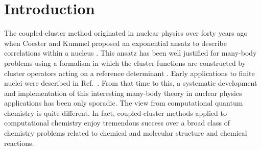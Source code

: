 
%


\section{Introduction}
\label{sec:introduction}

The coupled-cluster method originated in nuclear physics over
forty years ago when Coester and Kummel proposed an exponential ansatz 
to describe correlations within a nucleus 
\cite{coester58,coester60}. This ansatz has been well justified
for many-body problems using a formalism in which the
cluster functions are constructed by cluster operators acting on 
a reference determinant \cite{harris92}. Early applications 
to finite nuclei were described in Ref.~\cite{kum78}. 
From that
time to this, a systematic development and implementation 
of this interesting many-body theory in nuclear 
physics applications has been only sporadic. The view from 
computational quantum chemistry is quite different. 
In fact, coupled-cluster methods applied to computational chemistry 
enjoy tremendous success 
\cite{bartlett81,comp_chem_rev00,piotr1,helgaker,arponen97,lindgren} 
over a broad class of
chemistry problems related to chemical and 
molecular structure and chemical reactions. 

